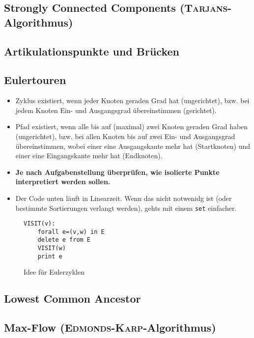 \subsection{Strongly Connected Components (\textsc{Tarjans}-Algorithmus)}


\subsection{Artikulationspunkte und Brücken}


\subsection{Eulertouren}
\begin{itemize}
	\item Zyklus existiert, wenn jeder Knoten geraden Grad hat (ungerichtet), bzw. bei jedem Knoten Ein- und Ausgangsgrad übereinstimmen (gerichtet).
	\item Pfad existiert, wenn alle bis auf (maximal) zwei Knoten geraden Grad haben (ungerichtet), bzw. bei allen Knoten bis auf zwei Ein- und Ausgangsgrad übereinstimmen, wobei einer eine Ausgangskante mehr hat (Startknoten) und einer eine Eingangskante mehr hat (Endknoten).
	\item \textbf{Je nach Aufgabenstellung überprüfen, wie isolierte Punkte interpretiert werden sollen.}
	\item Der Code unten läuft in Linearzeit. Wenn das nicht notwenidg ist (oder bestimmte Sortierungen verlangt werden), gehts mit einem \lstinline{set} einfacher.
\end{itemize}
\begin{figure}[h]
\begin{lstlisting}
VISIT(v):
	forall e=(v,w) in E
	delete e from E
	VISIT(w)
	print e
\end{lstlisting}
\caption{Idee für Eulerzyklen}
\end{figure}


\subsection{Lowest Common Ancestor}


\subsection{Max-Flow (\textsc{Edmonds-Karp}-Algorithmus)}


